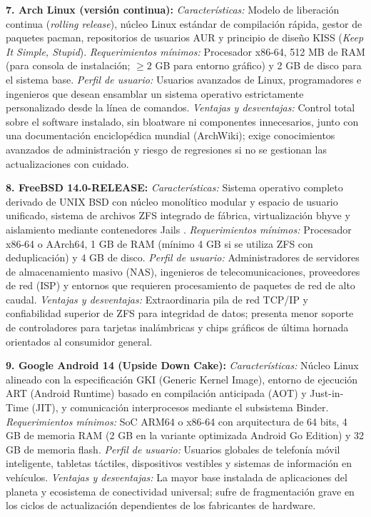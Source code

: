 \documentclass[12pt]{article}
\begin{document}
\smallskip
\noindent\textbf{7. Arch Linux (versión continua):}
\textit{Características:} Modelo de liberación continua (\textit{rolling release}), núcleo Linux estándar de compilación rápida, gestor de paquetes pacman, repositorios de usuarios AUR y principio de diseño KISS (\textit{Keep It Simple, Stupid}).
\textit{Requerimientos mínimos:} Procesador x86-64, 512 MB de RAM (para consola de instalación; $\ge 2$ GB para entorno gráfico) y 2 GB de disco para el sistema base.
\textit{Perfil de usuario:} Usuarios avanzados de Linux, programadores e ingenieros que desean ensamblar un sistema operativo estrictamente personalizado desde la línea de comandos.
\textit{Ventajas y desventajas:} Control total sobre el software instalado, sin bloatware ni componentes innecesarios, junto con una documentación enciclopédica mundial (ArchWiki); exige conocimientos avanzados de administración y riesgo de regresiones si no se gestionan las actualizaciones con cuidado.

\smallskip
\noindent\textbf{8. FreeBSD 14.0-RELEASE:}
\textit{Características:} Sistema operativo completo derivado de UNIX BSD con núcleo monolítico modular y espacio de usuario unificado, sistema de archivos ZFS integrado de fábrica, virtualización bhyve y aislamiento mediante contenedores Jails \parencite{freebsdRelnotes}.
\textit{Requerimientos mínimos:} Procesador x86-64 o AArch64, 1 GB de RAM (mínimo 4 GB si se utiliza ZFS con deduplicación) y 4 GB de disco.
\textit{Perfil de usuario:} Administradores de servidores de almacenamiento masivo (NAS), ingenieros de telecomunicaciones, proveedores de red (ISP) y entornos que requieren procesamiento de paquetes de red de alto caudal.
\textit{Ventajas y desventajas:} Extraordinaria pila de red TCP/IP y confiabilidad superior de ZFS para integridad de datos; presenta menor soporte de controladores para tarjetas inalámbricas y chips gráficos de última hornada orientados al consumidor general.

\smallskip
\noindent\textbf{9. Google Android 14 (Upside Down Cake):}
\textit{Características:} Núcleo Linux alineado con la especificación GKI (Generic Kernel Image), entorno de ejecución ART (Android Runtime) basado en compilación anticipada (AOT) y Just-in-Time (JIT), y comunicación interprocesos mediante el subsistema Binder.
\textit{Requerimientos mínimos:} SoC ARM64 o x86-64 con arquitectura de 64 bits, 4 GB de memoria RAM (2 GB en la variante optimizada Android Go Edition) y 32 GB de memoria flash.
\textit{Perfil de usuario:} Usuarios globales de telefonía móvil inteligente, tabletas táctiles, dispositivos vestibles y sistemas de información en vehículos.
\textit{Ventajas y desventajas:} La mayor base instalada de aplicaciones del planeta y ecosistema de conectividad universal; sufre de fragmentación grave en los ciclos de actualización dependientes de los fabricantes de hardware.
\end{document}
